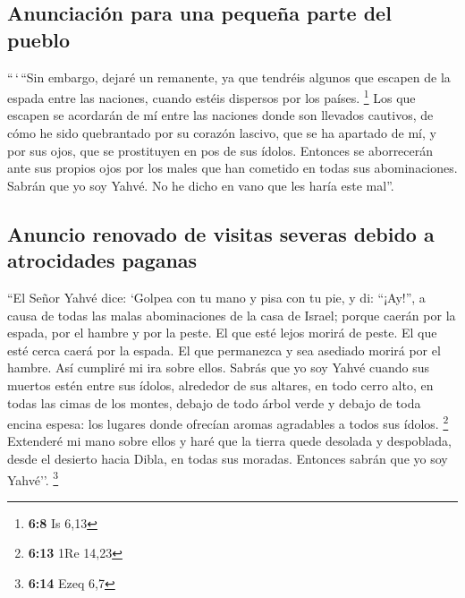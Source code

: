 \begin{paracol}{2}
\hypertarget{anunciaciuxf3n-para-una-pequeuxf1a-parte-del-pueblo}{%
\subsection{Anunciación para una pequeña parte del
pueblo}\label{anunciaciuxf3n-para-una-pequeuxf1a-parte-del-pueblo}}

 ``\,`\,``Sin embargo, dejaré un remanente, ya que
tendréis algunos que escapen de la espada entre las naciones, cuando
estéis dispersos por los países. \footnote{\textbf{6:8} Is 6,13}
 Los que escapen se acordarán de mí entre las naciones
donde son llevados cautivos, de cómo he sido quebrantado por su corazón
lascivo, que se ha apartado de mí, y por sus ojos, que se prostituyen en
pos de sus ídolos. Entonces se aborrecerán ante sus propios ojos por los
males que han cometido en todas sus abominaciones. 
Sabrán que yo soy Yahvé. No he dicho en vano que les haría este mal''.

\hypertarget{anuncio-renovado-de-visitas-severas-debido-a-atrocidades-paganas}{%
\subsection{Anuncio renovado de visitas severas debido a atrocidades
paganas}\label{anuncio-renovado-de-visitas-severas-debido-a-atrocidades-paganas}}

 ``El Señor Yahvé dice: `Golpea con tu mano y pisa con tu
pie, y di: ``¡Ay!'', a causa de todas las malas abominaciones de la casa
de Israel; porque caerán por la espada, por el hambre y por la peste.
 El que esté lejos morirá de peste. El que esté cerca
caerá por la espada. El que permanezca y sea asediado morirá por el
hambre. Así cumpliré mi ira sobre ellos.  Sabrás que yo
soy Yahvé cuando sus muertos estén entre sus ídolos, alrededor de sus
altares, en todo cerro alto, en todas las cimas de los montes, debajo de
todo árbol verde y debajo de toda encina espesa: los lugares donde
ofrecían aromas agradables a todos sus ídolos. \footnote{\textbf{6:13}
  1Re 14,23}  Extenderé mi mano sobre ellos y haré que la
tierra quede desolada y despoblada, desde el desierto hacia Dibla, en
todas sus moradas. Entonces sabrán que yo soy Yahvé''. \footnote{\textbf{6:14}
  Ezeq 6,7}

\switchcolumn
\begin{otherlanguage}{english}

\hypertarget{section-11}{%
}
\end{otherlanguage}
\end{paracol}
